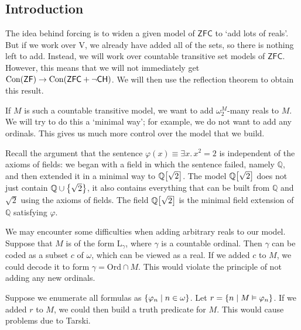 \subsection{Introduction}
The idea behind forcing is to widen a given model of \( \mathsf{ZFC} \) to `add lots of reals'.
But if we work over \( \mathrm{V} \), we already have added all of the sets, so there is nothing left to add.
Instead, we will work over countable transitive set models of \( \mathsf{ZFC} \).
However, this means that we will not immediately get \( \operatorname{Con}(\mathsf{ZF}) \to \operatorname{Con}(\mathsf{ZFC} + \neg\mathsf{CH}) \).
We will then use the reflection theorem to obtain this result.

If \( M \) is such a countable transitive model, we want to add \( \omega_2^M \)-many reals to \( M \).
We will try to do this a `minimal way'; for example, we do not want to add any ordinals.
This gives us much more control over the model that we build.

Recall the argument that the sentence \( \varphi(x) \equiv \exists x.\, x^2 = 2 \) is independent of the axioms of fields: we began with a field in which the sentence failed, namely \( \mathbb Q \), and then extended it in a minimal way to \( \mathbb Q\qty[\sqrt{2}] \).
The model \( \mathbb Q\qty[\sqrt{2}] \) does not just contain \( \mathbb Q \cup \qty{\sqrt{2}} \), it also contains everything that can be built from \( \mathbb Q \) and \( \sqrt{2} \) using the axioms of fields.
The field \( \mathbb Q\qty[\sqrt{2}] \) is the minimal field extension of \( \mathbb Q \) satisfying \( \varphi \).

We may encounter some difficulties when adding arbitrary reals to our model.
Suppose that \( M \) is of the form \( \mathrm{L}_\gamma \), where \( \gamma \) is a countable ordinal.
Then \( \gamma \) can be coded as a subset \( c \) of \( \omega \), which can be viewed as a real.
If we added \( c \) to \( M \), we could decode it to form \( \gamma = \mathrm{Ord} \cap M \).
This would violate the principle of not adding any new ordinals.

Suppose we enumerate all formulas as \( \qty{\varphi_n \mid n \in \omega} \).
Let \( r = \qty{n \mid M \vDash \varphi_n} \).
If we added \( r \) to \( M \), we could then build a truth predicate for \( M \).
This would cause problems due to Tarski.

